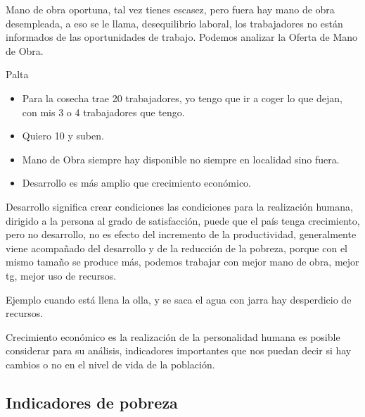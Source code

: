 \documentclass[
  a4paper,
]{article}
\begin{document}
Mano de obra oportuna, tal vez tienes escasez, pero fuera hay mano de
obra desempleada, a eso se le llama, desequilibrio laboral, los
trabajadores no están informados de las oportunidades de trabajo.
Podemos analizar la Oferta de Mano de Obra.

Palta

\begin{itemize}
\item
  Para la cosecha trae 20 trabajadores, yo tengo que ir a coger lo que
  dejan, con mis 3 o 4 trabajadores que tengo.
\item
  Quiero 10 y suben.
\item
  Mano de Obra siempre hay disponible no siempre en localidad sino
  fuera.
\item
  Desarrollo es más amplio que crecimiento económico.
\end{itemize}

Desarrollo significa crear condiciones las condiciones para la
realización humana, dirigido a la persona al grado de satisfacción,
puede que el país tenga crecimiento, pero no desarrollo, no es efecto
del incremento de la productividad, generalmente viene acompañado del
desarrollo y de la reducción de la pobreza, porque con el mismo tamaño
se produce más, podemos trabajar con mejor mano de obra, mejor tg, mejor
uso de recursos.

Ejemplo cuando está llena la olla, y se saca el agua con jarra hay
desperdicio de recursos.

Crecimiento económico es la realización de la personalidad humana es
posible considerar para su análisis, indicadores importantes que nos
puedan decir si hay cambios o no en el nivel de vida de la población.

\hypertarget{indicadores-de-pobreza}{%
\subsection{Indicadores de pobreza}\label{indicadores-de-pobreza}}
\end{document}
